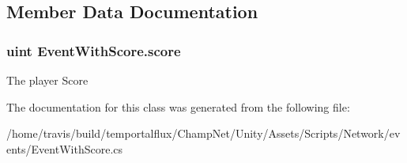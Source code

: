 \subsection{Member Data Documentation}
\hypertarget{class_event_with_score_a521dbdffa1ed1b2a08a671d881f66062}{
\subsubsection[{score}]{\setlength{\rightskip}{0pt plus 5cm}uint Event\-With\-Score.\-score}}\label{class_event_with_score_a521dbdffa1ed1b2a08a671d881f66062}


The player Score 



The documentation for this class was generated from the following file\-:\begin{DoxyCompactItemize}
\item 
/home/travis/build/temportalflux/\-Champ\-Net/\-Unity/\-Assets/\-Scripts/\-Network/events/Event\-With\-Score.\-cs\end{DoxyCompactItemize}
